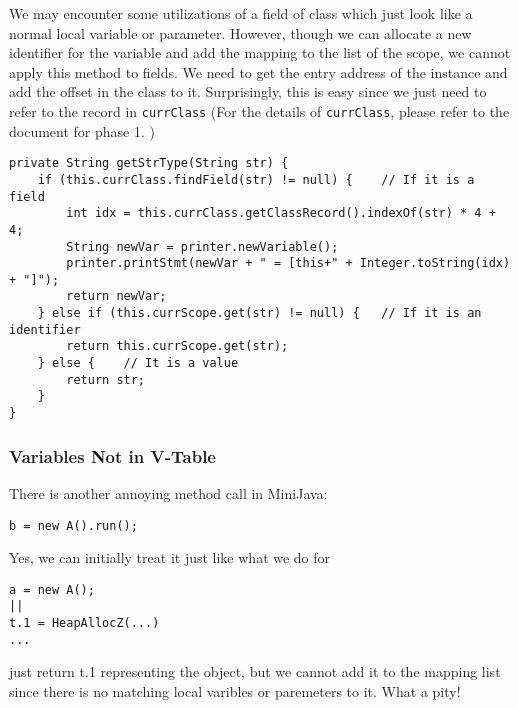 \documentclass[letterpaper, 14pt]{article}
\begin{document}
We may encounter some utilizations of a field of class which just look like a normal local variable or parameter. However, though we can allocate a new identifier for the variable and add the mapping to the list of the scope, we cannot apply this method to fields. We need to get the entry address of the instance and add the offset in the class to it. Surprisingly, this is easy since we just need to refer to the record in \texttt{currClass} (For the details of \texttt{currClass}, please refer to the document for phase 1. )
\begin{lstlisting}
private String getStrType(String str) {
	if (this.currClass.findField(str) != null) {	// If it is a field
		int idx = this.currClass.getClassRecord().indexOf(str) * 4 + 4;
		String newVar = printer.newVariable();
		printer.printStmt(newVar + " = [this+" + Integer.toString(idx) + "]");
		return newVar;
	} else if (this.currScope.get(str) != null) {	// If it is an identifier
		return this.currScope.get(str);
	} else {	// It is a value
		return str;
	}
}
\end{lstlisting}

\subsubsection{Variables Not in V-Table}

There is another annoying method call in MiniJava:
\begin{lstlisting}
b = new A().run();
\end{lstlisting}

Yes, we can initially treat it just like what we do for
\begin{lstlisting}
a = new A();
||
t.1 = HeapAllocZ(...)
...
\end{lstlisting}
just return t.1 representing the object, but we cannot add it to the mapping list since there is no matching local varibles or paremeters to it. What a pity! 
\end{document}
